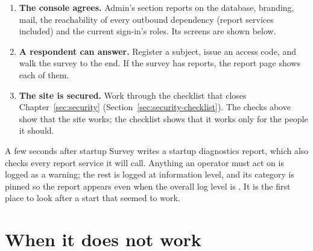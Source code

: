 \documentclass[11pt, a4paper]{article}
\begin{document}
\begin{enumerate}
  \item \textbf{The console agrees.} Admin's  section reports on the database,
        branding, mail, the reachability of every outbound dependency (report services
        included) and the current sign-in's roles. Its screens are shown below.
  \item \textbf{A respondent can answer.} Register a subject, issue an access code, and walk
        the survey to the end. If the survey has reports, the report page shows each of them.
  \item \textbf{The site is secured.} Work through the checklist that closes
        Chapter~\ref{sec:security} (Section~\ref{sec:security-checklist}). The checks above
        show that the site works; the checklist shows that it works only for the people it
        should.
\end{enumerate}






\begin{elicitnote}
A few seconds after startup Survey writes a startup diagnostics report, which also checks
every report service it will call. Anything an operator must act on is logged as a warning;
the rest is logged at information level, and its category is pinned so the report appears even
when the overall log level is . It is the first place to look after a start that
seemed to work.
\end{elicitnote}

\section{When it does not work}
\label{sec:trouble}
\end{document}
